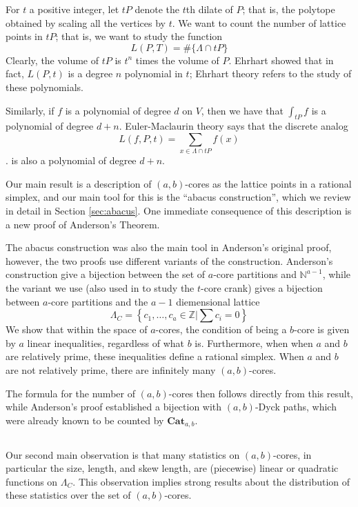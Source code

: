 \documentclass{amsart}[12pt]
\theoremstyle{definition}
\newcommand{\Z}{\mathbb{Z}}
\newcommand{\N}{\mathbb{N}}
\newcommand{\Cat}{\mathbf{Cat}}
\begin{document}
For $t$ a positive integer, let $tP$ denote the $t$th dilate of $P$; that is, the polytope obtained by scaling all the vertices by $t$.  We want to count the number of lattice points in $tP$; that is, we want to study the function
$$L(P,T)=\#\{\Lambda\cap tP\}$$
Clearly, the volume of $tP$ is $t^n$ times the volume of $P$.  Ehrhart showed that in fact, $L(P,t)$ is a degree $n$ polynomial in $t$; Ehrhart theory refers to the study of these polynomials.

Similarly, if $f$ is a polynomial of degree $d$ on $V$, then we have that $\int_{tP} f$ is a polynomial of degree $d+n$.  Euler-Maclaurin theory says that the discrete analog
 $$L(f, P, t)=\sum_{x\in\Lambda\cap tP} f(x)$$.
is also a polynomial of degree $d+n$.







Our main result is a description of $(a,b)$-cores as the lattice points in a rational simplex, and our main tool for this is the ``abacus construction'', which we review in detail in Section \ref{sec:abacus}.  One immediate consequence of this description is a new proof of Anderson's Theorem.

The abacus construction was also the main tool in Anderson's original proof, however, the two proofs use different variants of the construction.  Anderson's construction give a bijection between the set of $a$-core partitions and $\N^{a-1}$, while the variant we use (also used in \cite{GKS} to study the $t$-core crank) gives a bijection between $a$-core partitions and the $a-1$ diemensional lattice 
$$\Lambda_C=\left\{c_1,\dots,c_a\in\Z\Big |\sum c_i=0\right\}$$
We show that within the space of $a$-cores, the condition of being a $b$-core is given by $a$ linear inequalities, regardless of what $b$ is.  Furthermore, when when $a$ and $b$ are relatively prime, these inequalities define a rational simplex.  When $a$ and $b$ are not relatively prime, there are infinitely many $(a,b)$-cores.

The formula for the number of $(a,b)$-cores then follows directly from this result, while Anderson's proof established a bijection with $(a,b)$-Dyck paths, which were already known to be counted by $\Cat_{a,b}$.


\subsection{}
Our second main observation is that many statistics on $(a,b)$-cores, in particular the size, length, and skew length, are (piecewise) linear or quadratic functions on $\Lambda_C$.  This observation implies strong results about the distribution of these statistics over the set of $(a,b)$-cores.
\end{document}
